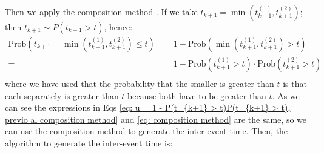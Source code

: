 Then we apply the composition method \cite{dassios2013exact}. If we take $t_{k+1}=\min(t_{k+1}^(1),t_{k+1}^(2))$; then $t_{k+1}\sim P(t_{k+1}>t)$, hence:
\begin{equation}
    \begin{split}
        \text{Prob}(t_{k+1}=\min\left(  t_{k+1}^{(1)},t_{k+1}^{(2)} \right)\leq t)=&1-\text{Prob}\left( \min \left( t_{k+1}^{(1)},t_{k+1}^{(2)}\right)>t \right)\\
        =&1-\text{Prob}\left( t_{k+1}^{(1)}>t \right)\cdot\text{Prob}\left( t_{k+1}^{(2)}>t \right)\\
    \end{split}
    \label{eq: composition method}
\end{equation}
where we have used that the probability that the smaller is greater than $t$ is that each separately is greater than $t$ because both have to be greater than $t$. As we can 
see the expressions in Eqs \ref{eq: u = 1 - P(t_{k+1} > t)P(t_{k+1} > t), previo al composition method} and \ref{eq: composition method} are the same, so we can use the composition 
method to generate the inter-event time. Then, the algorithm to generate the inter-event time is:
